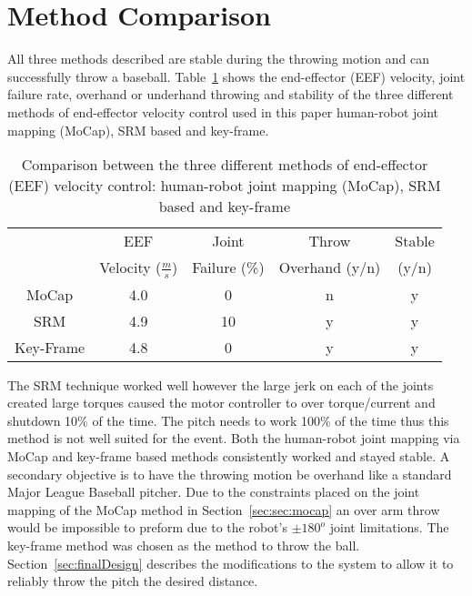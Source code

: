 \section{Method Comparison}\label{sec:comparison}
All three methods described are stable during the throwing motion and can successfully throw a baseball.  Table~\ref{table:comp} shows the end-effector (EEF) velocity, joint failure rate, overhand or underhand throwing and stability of the three different methods of end-effector velocity control used in this paper human-robot joint mapping (MoCap), SRM based and key-frame.

\begin{table}[!t]
\renewcommand{\arraystretch}{1.3}
\caption{Comparison between the three different methods of end-effector (EEF) velocity control: human-robot joint mapping (MoCap), SRM based and key-frame}
\label{table:comp}
\centering
\begin{tabular}{|c|c|c|c|c|}
\hline
  				& EEF 																	& Joint 						& Throw						& Stable  			\\
  				& Velocity ($\frac{m}{s}$)							& Failure (\%)			& Overhand (y/n)	& (y/n)					\\
\hline	
MoCap 		& 4.0																		& 0									& n								& y 						\\
\hline
SRM 			& 4.9																		& 10								& y								& y							\\
\hline
Key-Frame & 4.8 																	& 0 								& y								&	y							\\
\hline
\end{tabular}
\end{table}

The SRM technique worked well however the large jerk on each of the joints created large torques caused the motor controller to over torque/current and shutdown 10\% of the time.  
The pitch needs to work 100\% of the time thus this method is not well suited for the event.  
Both the human-robot joint mapping via MoCap and key-frame based methods consistently worked and stayed stable.  A secondary objective is to have the throwing motion be overhand like a standard Major League Baseball pitcher.  
Due to the constraints placed on the joint mapping of the MoCap method in Section~\ref{sec:sec:mocap} an over arm throw would be impossible to preform due to the robot's $\pm180^o$ joint limitations.  The key-frame method was chosen as the method to throw the ball.  Section~\ref{sec:finalDesign} describes the modifications to the system to allow it to reliably throw the pitch the desired distance.